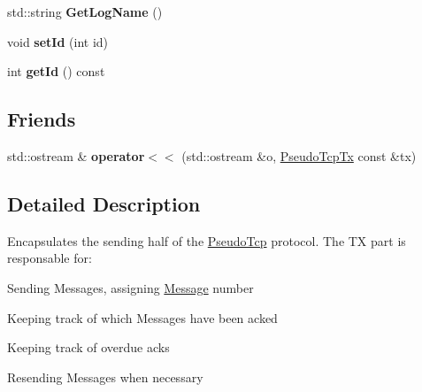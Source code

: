 \begin{DoxyCompactItemize}
\item 
\hypertarget{classPseudoTcp_1_1PseudoTcpTx_a6d3843b42bff2f5c2bf8e782bd6d2843}{
std::string {\bfseries GetLogName} ()}
\label{classPseudoTcp_1_1PseudoTcpTx_a6d3843b42bff2f5c2bf8e782bd6d2843}

\item 
\hypertarget{classPseudoTcp_1_1PseudoTcpTx_ae54c15a3b89ee9ef12370b3568863b8b}{
void {\bfseries setId} (int id)}
\label{classPseudoTcp_1_1PseudoTcpTx_ae54c15a3b89ee9ef12370b3568863b8b}

\item 
\hypertarget{classPseudoTcp_1_1PseudoTcpTx_a51eee9608065cbf4af43b764ea56bbcf}{
int {\bfseries getId} () const }
\label{classPseudoTcp_1_1PseudoTcpTx_a51eee9608065cbf4af43b764ea56bbcf}

\end{DoxyCompactItemize}
\subsection*{Friends}
\begin{DoxyCompactItemize}
\item 
\hypertarget{classPseudoTcp_1_1PseudoTcpTx_a70867e57670837e8e75b49c454fb2d60}{
std::ostream \& {\bfseries operator$<$$<$} (std::ostream \&o, \hyperlink{classPseudoTcp_1_1PseudoTcpTx}{PseudoTcpTx} const \&tx)}
\label{classPseudoTcp_1_1PseudoTcpTx_a70867e57670837e8e75b49c454fb2d60}

\end{DoxyCompactItemize}


\subsection{Detailed Description}
Encapsulates the sending half of the \hyperlink{namespacePseudoTcp}{PseudoTcp} protocol. The TX part is responsable for:
\begin{DoxyEnumerate}
\item Sending Messages, assigning \hyperlink{classPseudoTcp_1_1Message}{Message} number
\item Keeping track of which Messages have been acked
\item Keeping track of overdue acks
\item Resending Messages when necessary 
\end{DoxyEnumerate}

